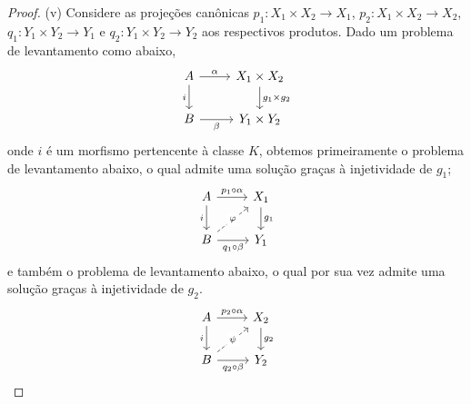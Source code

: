 \begin{proof}
  \smallskip
  (v) Considere as projeções canônicas $p_1: X_1 \times X_2 \to X_1$, $p_2: X_1 \times X_2 \to X_2$, $q_1: Y_1 \times Y_2 \to Y_1$ e $q_2: Y_1 \times Y_2 \to Y_2$ aos respectivos produtos.
  Dado um problema de levantamento como abaixo,
  \begin{displaymath}
    \begin{tikzcd}
      A
      \arrow[r, "\alpha"]
      \arrow[d, "i" swap]
      & X_1 \times X_2
      \arrow[d, "g_1 \times g_2"]
      \\ B
      \arrow[r, "\beta" swap]
      & Y_1 \times Y_2
    \end{tikzcd}
  \end{displaymath}
  onde $i$ é um morfismo pertencente à classe $K$, obtemos primeiramente o problema de levantamento abaixo, o qual admite uma solução graças à injetividade de $g_1$;
  \begin{equation}\label{eq:produto_inj_diag_2}
    \begin{tikzcd}
      A
      \arrow[r, "p_1 \circ \alpha"]
      \arrow[d, "i" swap]
      & X_1
      \arrow[d, "g_1"]
      \\ B
      \arrow[r, "q_1 \circ \beta" swap]
      \arrow[ru, dashed, "\varphi" description]
      & Y_1
    \end{tikzcd}
  \end{equation}
  e também o problema de levantamento abaixo, o qual por sua vez admite uma solução graças à injetividade de $g_2$.
  \begin{equation}\label{eq:produto_inj_diag_3}
    \begin{tikzcd}
      A
      \arrow[r, "p_2 \circ \alpha"]
      \arrow[d, "i" swap]
      & X_2
      \arrow[d, "g_2"]
      \\ B
      \arrow[r, "q_2 \circ \beta" swap]
      \arrow[ru, dashed, "\psi" description]
      & Y_2
    \end{tikzcd}
  \end{equation}


\end{proof}
